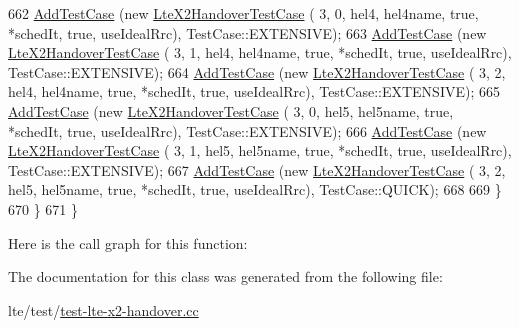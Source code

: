 \begin{DoxyCode}
662           \hyperlink{classns3_1_1TestCase_a3718088e3eefd5d6454569d2e0ddd835}{AddTestCase} (\textcolor{keyword}{new} \hyperlink{classLteX2HandoverTestCase}{LteX2HandoverTestCase} (  3,    0,    hel4, 
      hel4name, \textcolor{keyword}{true}, *schedIt, \textcolor{keyword}{true},  useIdealRrc), TestCase::EXTENSIVE);
663           \hyperlink{classns3_1_1TestCase_a3718088e3eefd5d6454569d2e0ddd835}{AddTestCase} (\textcolor{keyword}{new} \hyperlink{classLteX2HandoverTestCase}{LteX2HandoverTestCase} (  3,    1,    hel4, 
      hel4name, \textcolor{keyword}{true}, *schedIt, \textcolor{keyword}{true},  useIdealRrc), TestCase::EXTENSIVE);
664           \hyperlink{classns3_1_1TestCase_a3718088e3eefd5d6454569d2e0ddd835}{AddTestCase} (\textcolor{keyword}{new} \hyperlink{classLteX2HandoverTestCase}{LteX2HandoverTestCase} (  3,    2,    hel4, 
      hel4name, \textcolor{keyword}{true}, *schedIt, \textcolor{keyword}{true},  useIdealRrc), TestCase::EXTENSIVE);
665           \hyperlink{classns3_1_1TestCase_a3718088e3eefd5d6454569d2e0ddd835}{AddTestCase} (\textcolor{keyword}{new} \hyperlink{classLteX2HandoverTestCase}{LteX2HandoverTestCase} (  3,    0,    hel5, 
      hel5name, \textcolor{keyword}{true}, *schedIt, \textcolor{keyword}{true},  useIdealRrc), TestCase::EXTENSIVE);
666           \hyperlink{classns3_1_1TestCase_a3718088e3eefd5d6454569d2e0ddd835}{AddTestCase} (\textcolor{keyword}{new} \hyperlink{classLteX2HandoverTestCase}{LteX2HandoverTestCase} (  3,    1,    hel5, 
      hel5name, \textcolor{keyword}{true}, *schedIt, \textcolor{keyword}{true},  useIdealRrc), TestCase::EXTENSIVE);
667           \hyperlink{classns3_1_1TestCase_a3718088e3eefd5d6454569d2e0ddd835}{AddTestCase} (\textcolor{keyword}{new} \hyperlink{classLteX2HandoverTestCase}{LteX2HandoverTestCase} (  3,    2,    hel5, 
      hel5name, \textcolor{keyword}{true}, *schedIt, \textcolor{keyword}{true},  useIdealRrc), TestCase::QUICK);
668 
669         \}
670     \}
671 \}
\end{DoxyCode}


Here is the call graph for this function\+:




The documentation for this class was generated from the following file\+:\begin{DoxyCompactItemize}
\item 
lte/test/\hyperlink{test-lte-x2-handover_8cc}{test-\/lte-\/x2-\/handover.\+cc}\end{DoxyCompactItemize}

